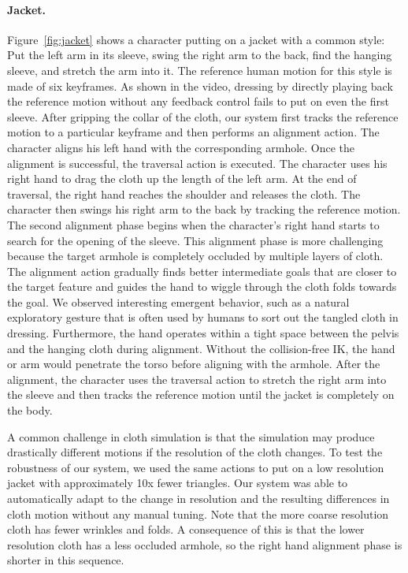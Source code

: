 \paragraph{Jacket.} Figure~\ref{fig:jacket} shows a character putting on a jacket with a common style: Put the left arm in its sleeve, swing the right arm to the back, find the hanging sleeve, and stretch the arm into it. The reference human motion for this style is made of six keyframes. As shown in the video, dressing by directly playing back the reference motion without any feedback control fails to put on even the first sleeve. After gripping the collar of the cloth, our system first tracks the reference motion to a particular keyframe and then performs an alignment action. The character aligns his left hand with the corresponding armhole. Once the alignment is successful, the traversal action is executed. The character uses his right hand to drag the cloth up the length of the left arm. At the end of traversal, the right hand reaches the shoulder and releases the cloth. The character then swings his right arm to the back by tracking the reference motion. The second alignment phase begins when the character's right hand starts to search for the opening of the sleeve. This alignment phase is more challenging because the target armhole is completely occluded by multiple layers of cloth. The alignment action gradually finds better intermediate goals that are closer to the target feature and guides the hand to wiggle through the cloth folds towards the goal. We observed interesting emergent behavior, such as a natural exploratory gesture that is often used by humans to sort out the tangled cloth in dressing. Furthermore, the hand operates within a tight space between the pelvis and the hanging cloth during alignment. Without the collision-free IK, the hand or arm would penetrate the torso before aligning with the armhole. After the alignment, the character uses the traversal action to stretch the right arm into the sleeve and then tracks the reference motion until the jacket is completely on the body. 

A common challenge in cloth simulation is that the simulation may produce
drastically different motions if the resolution of the cloth changes. To
test the robustness of our system, we used the same actions to put on a
low resolution jacket with approximately 10x fewer triangles. Our system
was able to automatically adapt to the change in resolution and the
resulting differences in cloth motion without any manual tuning. Note that
the more coarse resolution cloth has fewer wrinkles and folds.  A
consequence of this is that the lower resolution cloth has a less occluded
armhole, so the right hand alignment phase is shorter in this sequence.

